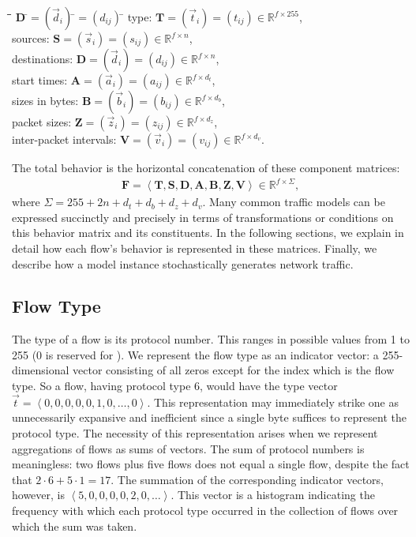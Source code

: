 \documentclass[twocolumn,final]{svjour3}
\newcommand{\caps}[1]{{\smaller{#1}}}
\newcommand{\R}{\mathbb{R}}
\newcommand{\mat}[1]{\mathbf{#1}}
\newcommand{\parensx}[1]{(#1)}
\newcommand{\seq}[1]{\left<#1\right>}
\renewcommand{\bullet}{\raisebox{2pt}{$\centerdot$}}
\begin{document}
\begin{tabbing}
\hspace{1em}\=\bullet\hspace{0.5em}\=\hspace{9.75em}\=
$\mat{D}\:$\=$=\parensx{\vec{d}_i}\:$\=$=\parensx{d_{ij}}\:$\=\kill
\>\bullet\> type: \>$\mat{T}$\>$=\parensx{\vec{t}_i}$\>$=\parensx{t_{ij}}$\>$\in\R^{f \times 255}$,\\
\>\bullet\> sources: \>$\mat{S}$\>$=\parensx{\vec{s}_i}$\>$=\parensx{s_{ij}}$\>$\in\R^{f \times n}$,\\
\>\bullet\> destinations: \>$\mat{D}$\>$=\parensx{\vec{d}_i}$\>$=\parensx{d_{ij}}$\>$\in\R^{f \times n}$,\\
\>\bullet\> start times: \>$\mat{A}$\>$=\parensx{\vec{a}_i}$\>$=\parensx{a_{ij}}$\>$\in\R^{f \times d_t}$,\\
\>\bullet\> sizes in bytes: \>$\mat{B}$\>$=\parensx{\vec{b}_i}$\>$=\parensx{b_{ij}}$\>$\in\R^{f \times d_b}$,\\
\>\bullet\> packet sizes: \>$\mat{Z}$\>$=\parensx{\vec{z}_i}$\>$=\parensx{z_{ij}}$\>$\in\R^{f \times d_z}$,\\
\>\bullet\> inter-packet intervals: \>$\mat{V}$\>$=\parensx{\vec{v}_i}$\>$=\parensx{v_{ij}}$\>$\in\R^{f \times d_v}$.
\end{tabbing}
The total behavior is the horizontal concatenation of these component matrices:
\begin{align}
\mat{F} = \seq{\mat{T},\mat{S},\mat{D},\mat{A},\mat{B},\mat{Z},\mat{V}} \in \R^{f \times \Sigma},
\end{align}
where $\Sigma=255+2n+d_t+d_b+d_z+d_v$. Many common traffic models can be expressed succinctly and precisely in terms of transformations or conditions on this behavior matrix and its constituents. In the following sections, we explain in detail how each flow's behavior is represented in these matrices. Finally, we describe how a model instance stochastically generates network traffic.

\subsection{Flow Type}

The type of a flow is its \caps{IP} protocol number. This ranges in possible values from 1 to 255 (0 is reserved for \caps{IPv6}). We represent the flow type as an indicator vector: a 255-dimensional vector consisting of all zeros except for the index which is the flow type. So a \caps{TCP} flow, having protocol type 6, would have the type vector $\vec{t}=\seq{0,0,0,0,0,1,0,\dots,0}$. This representation may immediately strike one as unnecessarily expansive and inefficient since a single byte suffices to represent the protocol type. The necessity of this representation arises when we represent aggregations of flows as sums of vectors. The sum of protocol numbers is meaningless: two \caps{TCP} flows plus five \caps{ICMP} flows does not equal a single \caps{UDP} flow, despite the fact that $2\cdot6+5\cdot1=17$. The summation of the corresponding indicator vectors, however, is $\seq{5,0,0,0,0,2,0,\dots}$. This vector is a histogram indicating the frequency with which each protocol type occurred in the collection of flows over which the sum was taken.
\end{document}
